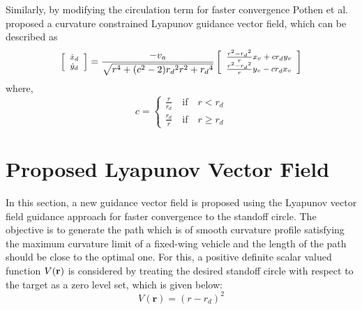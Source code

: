 \documentclass[Afour,sagev,times]{sagej}
\begin{document}
Similarly, by modifying the circulation term for faster convergence Pothen et al.\cite{pothen2017curvature} proposed a curvature constrained Lyapunov guidance vector field, which can be described as  
\begin{equation}
\begin{footnotesize}
\left[ {\begin{array}{*{20}{c}}
	{\dot{x}_{d} } \\ 
	{\dot{y}_{d} } 
	\end{array}} \right] = \frac{{ - v_a}}{{\sqrt {{r^4} + ({c^2} - 2){r_d}^2{r^2} + {r_d}^4} }}\left[ {\begin{array}{*{20}{c}}
	{\frac{{{r^2} - {r_d}^2}}{r}x_v + c{r_d}y_v} \\ 
	{\frac{{{r^2} - {r_d}^2}}{r}y_v - c{r_d}x_v} 
	\end{array}} \right]
	\end{footnotesize}
\end{equation} where, 
\[c = \left\{ {\begin{array}{*{20}{c}}
	{\frac{r}{{{r_d}}}}  \quad \textrm{if} \quad r<{r_d}\\ 
	{\frac{{{r_d}}}{r}}  \quad \textrm{if} \quad r \ge {r_d}
	\end{array}} \right.\]


\section{ Proposed Lyapunov Vector Field}

In this section, a new guidance vector field is proposed using the Lyapunov vector field guidance approach  for faster convergence to the standoff circle. The objective is to generate the path which is of smooth curvature profile satisfying the maximum curvature limit of a fixed-wing vehicle  and the length of the path should be close to the optimal one. For this, a positive definite scalar valued function $V({\bf{r}})$ is considered by treating the desired standoff circle with respect to the target as a zero level set, which is given below:
\begin{equation}
V(\boldsymbol{r}) = {(r - {r_d})^2}
\end{equation}
\end{document}
